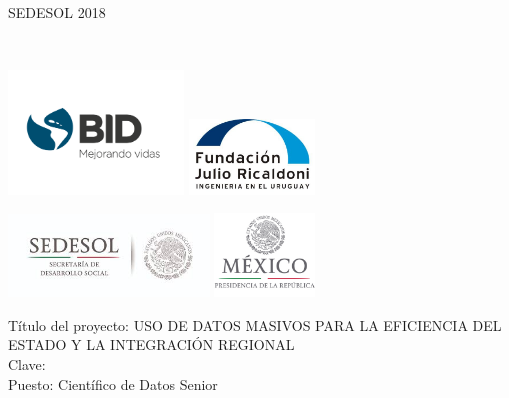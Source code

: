 \begin{center}
SEDESOL 2018
\vspace{0.5cm}

  \begin{center}



      \Large \MyName \\\vspace{5mm}
\begin{multicols}{2}
\includegraphics[width=0.35\textwidth]{images/bid}
\includegraphics[width=0.25\textwidth]{images/LOGO_FJR}
\end{multicols}
\begin{multicols}{2}
\includegraphics[width=0.4\textwidth]{images/sedesol}
\includegraphics[width=0.2\textwidth]{images/presidencia}
\end{multicols}


  \vspace{2mm}

  \end{center}
  \vspace{0.6cm}
  {\Large Título del proyecto: USO DE DATOS MASIVOS PARA LA EFICIENCIA DEL ESTADO Y LA INTEGRACIÓN REGIONAL\\}
    {\large Clave: \Contrato}\\
  \vspace{0.5cm}
  \Large Puesto: Científico de Datos Senior\\
  \vspace{1.5cm}


\end{center}

